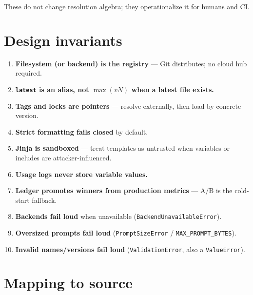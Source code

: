 \documentclass[11pt,a4paper]{article}
\newcommand{\code}[1]{\texttt{#1}}
\begin{document}
These do not change resolution algebra; they operationalize it for humans and
CI.

\section{Design invariants}

\begin{enumerate}[leftmargin=*]
  \item \textbf{Filesystem (or backend) is the registry} --- Git distributes;
        no cloud hub required.
  \item \textbf{\texttt{latest} is an alias, not $\max(vN)$ when a latest file
        exists.}
  \item \textbf{Tags and locks are pointers} --- resolve externally, then load
        by concrete version.
  \item \textbf{Strict formatting fails closed} by default.
  \item \textbf{Jinja is sandboxed} --- treat templates as untrusted when
        variables or includes are attacker-influenced.
  \item \textbf{Usage logs never store variable values.}
  \item \textbf{Ledger promotes winners from production metrics} --- A/B is
        the cold-start fallback.
  \item \textbf{Backends fail loud} when unavailable
        (\code{BackendUnavailableError}).
  \item \textbf{Oversized prompts fail loud}
        (\code{PromptSizeError} / \code{MAX\_PROMPT\_BYTES}).
  \item \textbf{Invalid names/versions fail loud}
        (\code{ValidationError}, also a \code{ValueError}).
\end{enumerate}

\section{Mapping to source}
\end{document}

